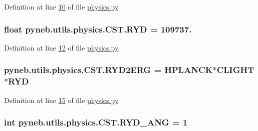 Definition at line \hyperlink{physics_8py_source_l00010}{10} of file \hyperlink{physics_8py_source}{physics.\-py}.

\hypertarget{classpyneb_1_1utils_1_1physics_1_1_c_s_t_a468e4f9fac1fbd71b5ca458a84ae05cc}{
\subsubsection[{R\-Y\-D}]{\setlength{\rightskip}{0pt plus 5cm}float pyneb.\-utils.\-physics.\-C\-S\-T.\-R\-Y\-D = 109737.\hspace{0.3cm}{\ttfamily [static]}}}\label{classpyneb_1_1utils_1_1physics_1_1_c_s_t_a468e4f9fac1fbd71b5ca458a84ae05cc}


Definition at line \hyperlink{physics_8py_source_l00012}{12} of file \hyperlink{physics_8py_source}{physics.\-py}.

\hypertarget{classpyneb_1_1utils_1_1physics_1_1_c_s_t_a3da260eac736f7d74c20f76f79239425}{
\subsubsection[{R\-Y\-D2\-E\-R\-G}]{\setlength{\rightskip}{0pt plus 5cm}pyneb.\-utils.\-physics.\-C\-S\-T.\-R\-Y\-D2\-E\-R\-G = {\bf H\-P\-L\-A\-N\-C\-K}$\ast${\bf C\-L\-I\-G\-H\-T}$\ast${\bf R\-Y\-D}\hspace{0.3cm}{\ttfamily [static]}}}\label{classpyneb_1_1utils_1_1physics_1_1_c_s_t_a3da260eac736f7d74c20f76f79239425}


Definition at line \hyperlink{physics_8py_source_l00015}{15} of file \hyperlink{physics_8py_source}{physics.\-py}.

\hypertarget{classpyneb_1_1utils_1_1physics_1_1_c_s_t_a43417605886b2dc4060af9388d7990bd}{
\subsubsection[{R\-Y\-D\-\_\-\-A\-N\-G}]{\setlength{\rightskip}{0pt plus 5cm}int pyneb.\-utils.\-physics.\-C\-S\-T.\-R\-Y\-D\-\_\-\-A\-N\-G = 1\hspace{0.3cm}{\ttfamily [static]}}}\label{classpyneb_1_1utils_1_1physics_1_1_c_s_t_a43417605886b2dc4060af9388d7990bd}


